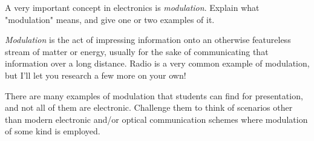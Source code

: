 

A very important concept in electronics is {\it modulation}.  Explain what "modulation" means, and give one or two examples of it.







{\it Modulation} is the act of impressing information onto an otherwise featureless stream of matter or energy, usually for the sake of communicating that information over a long distance.  Radio is a very common example of modulation, but I'll let you research a few more on your own!







There are many examples of modulation that students can find for presentation, and not all of them are electronic.  Challenge them to think of scenarios other than modern electronic and/or optical communication schemes where modulation of some kind is employed.





